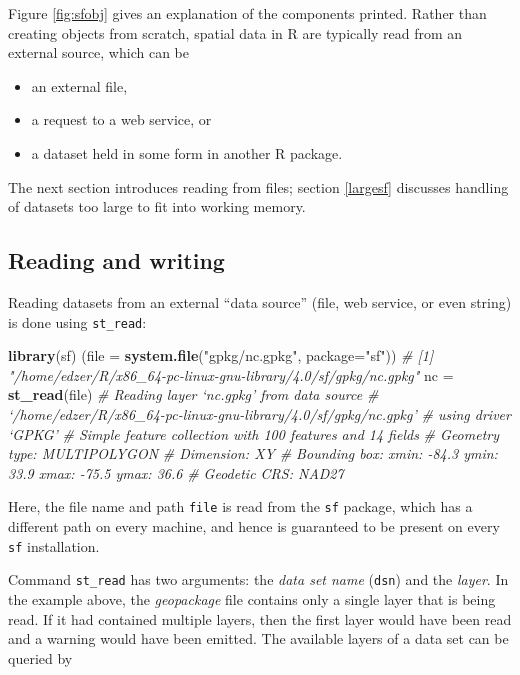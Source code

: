 \documentclass[]{book}
\newenvironment{Shaded}{\begin{snugshade}}{\end{snugshade}}
\newcommand{\CommentTok}[1]{\textcolor[rgb]{0.56,0.35,0.01}{\textit{#1}}}
\newcommand{\DataTypeTok}[1]{\textcolor[rgb]{0.13,0.29,0.53}{#1}}
\newcommand{\KeywordTok}[1]{\textcolor[rgb]{0.13,0.29,0.53}{\textbf{#1}}}
\newcommand{\NormalTok}[1]{#1}
\newcommand{\StringTok}[1]{\textcolor[rgb]{0.31,0.60,0.02}{#1}}
\providecommand{\tightlist}{%
  \setlength{\itemsep}{0pt}\setlength{\parskip}{0pt}}
\begin{document}
Figure \ref{fig:sfobj} gives an explanation of the components
printed. Rather than creating objects from scratch, spatial data
in R are typically read from an external source, which can be

\begin{itemize}
\tightlist
\item
  an external file,
\item
  a request to a web service, or
\item
  a dataset held in some form in another R package.
\end{itemize}

The next section introduces reading from files; section
\ref{largesf} discusses handling of datasets too large to fit into
working memory.

\hypertarget{reading-and-writing}{%
\subsection{Reading and writing}\label{reading-and-writing}}

Reading datasets from an external ``data source'' (file, web service,
or even string) is done using \texttt{st\_read}:

\begin{Shaded}
\begin{Highlighting}[]
\KeywordTok{library}\NormalTok{(sf)}
\NormalTok{(}\DataTypeTok{file =} \KeywordTok{system.file}\NormalTok{(}\StringTok{"gpkg/nc.gpkg"}\NormalTok{, }\DataTypeTok{package=}\StringTok{"sf"}\NormalTok{))}
\CommentTok{# [1] "/home/edzer/R/x86_64-pc-linux-gnu-library/4.0/sf/gpkg/nc.gpkg"}
\NormalTok{nc =}\StringTok{ }\KeywordTok{st_read}\NormalTok{(file)}
\CommentTok{# Reading layer `nc.gpkg' from data source }
\CommentTok{#   `/home/edzer/R/x86_64-pc-linux-gnu-library/4.0/sf/gpkg/nc.gpkg' }
\CommentTok{#   using driver `GPKG'}
\CommentTok{# Simple feature collection with 100 features and 14 fields}
\CommentTok{# Geometry type: MULTIPOLYGON}
\CommentTok{# Dimension:     XY}
\CommentTok{# Bounding box:  xmin: -84.3 ymin: 33.9 xmax: -75.5 ymax: 36.6}
\CommentTok{# Geodetic CRS:  NAD27}
\end{Highlighting}
\end{Shaded}

Here, the file name and path \texttt{file} is read from the \texttt{sf} package,
which has a different path on every machine, and hence is guaranteed
to be present on every \texttt{sf} installation.

Command \texttt{st\_read} has two arguments: the \emph{data set name} (\texttt{dsn})
and the \emph{layer}. In the example above, the \emph{geopackage} file
contains only a single layer that is being read. If it had contained
multiple layers, then the first layer would have been read and a
warning would have been emitted. The available layers of a data
set can be queried by
\end{document}
